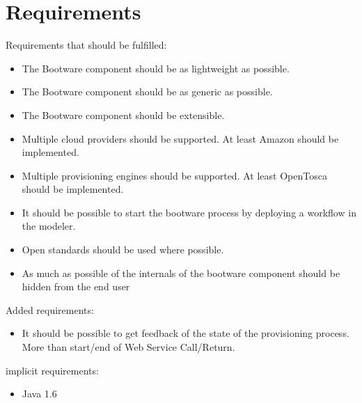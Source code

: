 \section{Requirements}

Requirements that should be fulfilled:

\begin{itemize}

	\item The Bootware component should be as lightweight as possible.

	\item The Bootware component should be as generic as possible.

	\item The Bootware component should be extensible.

	\item Multiple cloud providers should be supported. At least Amazon should be implemented.

	\item Multiple provisioning engines should be supported. At least OpenTosca should be implemented.

	\item It should be possible to start the bootware process by deploying a workflow in the modeler.

	\item Open standards should be used where possible.

	\item As much as possible of the internals of the bootware component should be hidden from the end user

\end{itemize}

Added requirements:

\begin{itemize}

	\item It should be possible to get feedback of the state of the provisioning process. More than start/end of Web Service Call/Return.

\end{itemize}

implicit requirements:

\begin{itemize}

	\item Java 1.6

\end{itemize}


